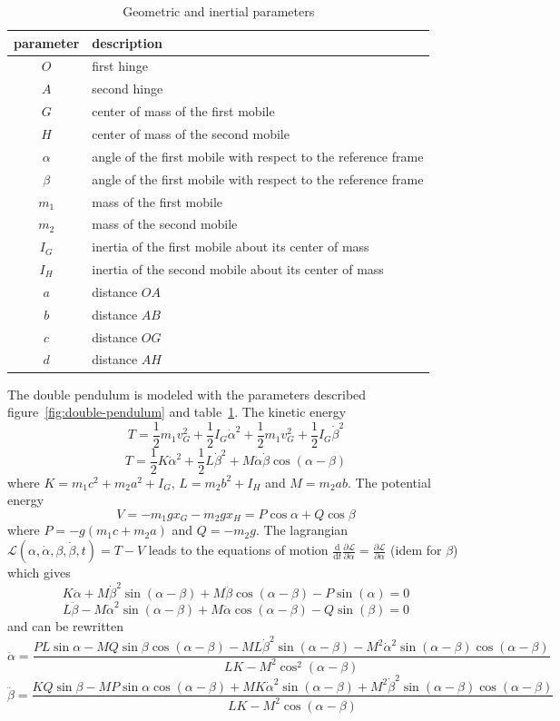 \documentclass[a4paper,10pt]{article}
\newcommand{\dd}{\ensuremath{\text{d}}}
\begin{document}
\begin{table}
  \begin{tabular}{c|l}
    parameter & description \\
    \hline
    $O$ 		& first hinge \\
    $A$ 		& second hinge \\
    $G$ 		& center of mass of the first mobile \\
    $H$ 		& center of mass of the second mobile \\
    $\alpha$ 		& angle of the first mobile with respect to the reference frame \\
    $\beta$ 		& angle of the first mobile with respect to the reference frame \\
    $m_1$		& mass of the first mobile \\
    $m_2$		& mass of the second mobile \\
    $I_G$		& inertia of the first mobile about its center of mass \\
    $I_H$		& inertia of the second mobile about its center of mass \\
    $a$			& distance $OA$ \\
    $b$			& distance $AB$ \\
    $c$			& distance $OG$ \\
    $d$			& distance $AH$
  \end{tabular}
  \caption{Geometric and inertial parameters \label{tab:parameters}}
\end{table}

The double pendulum is modeled with the parameters described figure~\ref{fig:double-pendulum} and table~\ref{tab:parameters}. The kinetic energy
$$ T = \frac{1}{2} m_1 v_G^2 + \frac{1}{2} I_G \dot{\alpha}^2 + \frac{1}{2} m_1 v_G^2 + \frac{1}{2} I_G \dot{\beta}^2 $$
$$ T = \frac{1}{2} K \dot{\alpha}^2 + \frac{1}{2} L \dot{\beta}^2 + M \dot{\alpha} \dot{\beta} \cos(\alpha-\beta) $$
where $K = m_1 c^2 + m_2 a^2 + I_G$, $L = m_2 b^2 + I_H$ and $M = m_2 a b$. The potential energy
$$ V = -m_1 g x_G - m_2 g x_H = P\cos\alpha + Q\cos\beta $$
where $P = -g(m_1 c + m_2 a)$ and $Q = - m_2 g$. The lagrangian $\mathscr{L}(\alpha, \dot{\alpha}, \beta, \dot{\beta}, t) = T-V$ leads to the equations of motion $\frac{\dd}{\dd t} \frac{\partial \mathscr{L}}{\partial \dot{\alpha}} = \frac{\partial \mathscr{L}}{\partial \alpha}$ (idem for $\beta$) which gives
$$ K \ddot{\alpha} + M \dot{\beta}^2\sin(\alpha-\beta) + M \ddot{\beta}\cos(\alpha-\beta) - P \sin(\alpha) = 0 $$
$$ L \ddot{\beta} - M \dot{\alpha}^2\sin(\alpha-\beta) + M \ddot{\alpha}\cos(\alpha-\beta) - Q \sin(\beta) = 0 $$
and can be rewritten
$$ \ddot{\alpha} = \frac{PL\sin\alpha-MQ\sin\beta\cos(\alpha-\beta)-ML\dot{\beta}^2\sin(\alpha-\beta)-M^2\dot{\alpha}^2\sin(\alpha-\beta)\cos(\alpha-\beta)}{LK-M^2\cos^2(\alpha-\beta)} $$
$$ \ddot{\beta} = \frac{KQ\sin\beta-MP\sin\alpha\cos(\alpha-\beta)+MK\dot{\alpha}^2\sin(\alpha-\beta)+M^2\dot{\beta}^2\sin(\alpha-\beta)\cos(\alpha-\beta)}{LK-M^2\cos(\alpha-\beta)} $$
\end{document}
